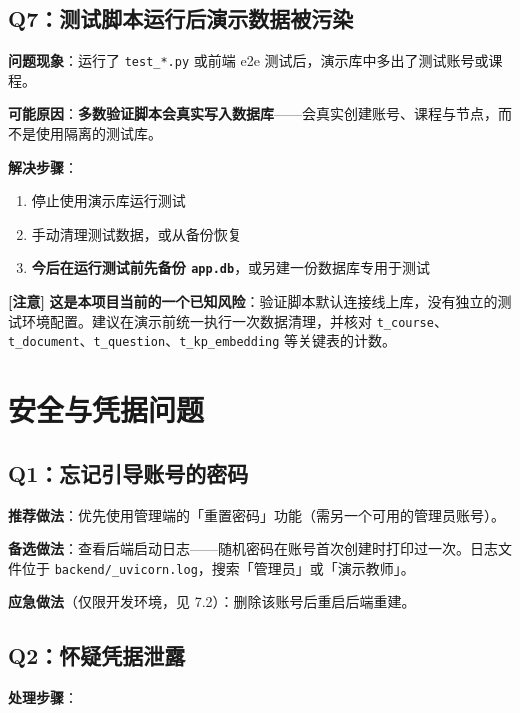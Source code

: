 \documentclass[UTF8,a4paper,11pt]{ctexrep}
\newcommand{\warnmark}{\textcolor{todobar}{\textbf{[注意]}}}
\begin{document}
\subsection{Q7：测试脚本运行后演示数据被污染}

\textbf{问题现象}：运行了 \texttt{test\_*.py} 或前端 e2e 测试后，演示库中多出了测试账号或课程。

\textbf{可能原因}：\textbf{多数验证脚本会真实写入数据库}——会真实创建账号、课程与节点，而不是使用隔离的测试库。

\textbf{解决步骤}：

\begin{enumerate}
\item 停止使用演示库运行测试
\item 手动清理测试数据，或从备份恢复
\item \textbf{今后在运行测试前先备份 \texttt{app.db}}，或另建一份数据库专用于测试
\end{enumerate}
\begin{todobox}
\warnmark{} \textbf{这是本项目当前的一个已知风险}：验证脚本默认连接线上库，没有独立的测试环境配置。建议在演示前统一执行一次数据清理，并核对 \texttt{t\_course}、\texttt{t\_document}、\texttt{t\_question}、\texttt{t\_kp\_embedding} 等关键表的计数。

\end{todobox}


\section{安全与凭据问题}


\subsection{Q1：忘记引导账号的密码}

\textbf{推荐做法}：优先使用管理端的「重置密码」功能（需另一个可用的管理员账号）。

\textbf{备选做法}：查看后端启动日志——随机密码在账号首次创建时打印过一次。日志文件位于 \texttt{backend/\_uvicorn.log}，搜索「管理员」或「演示教师」。

\textbf{应急做法}（仅限开发环境，见 7.2）：删除该账号后重启后端重建。


\subsection{Q2：怀疑凭据泄露}

\textbf{处理步骤}：
\end{document}
